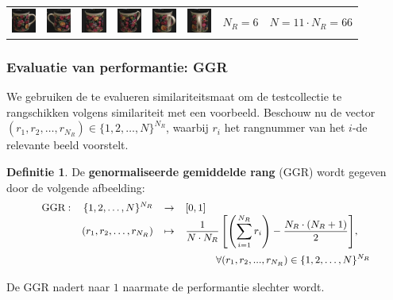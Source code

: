 \documentclass[dutch]{beamer}
\theoremstyle{definition}
\newtheorem{definitie}[theorem]{Definitie}
\theoremstyle{remark}
\theoremstyle{example}
\begin{document}
{\begin{center}
\begin{tabular}{c@{\ }c@{}c@{}c@{}c@{}c c@{\ }c@{}c@{}c@{}c@{}c}
\includegraphics[width=0.8cm]{coil/beeld-60.eps} &
\includegraphics[width=0.8cm]{coil/beeld-61.eps} &
\includegraphics[width=0.8cm]{coil/beeld-62.eps} &
\includegraphics[width=0.8cm]{coil/beeld-63.eps} &
\includegraphics[width=0.8cm]{coil/beeld-64.eps} &
\includegraphics[width=0.8cm]{coil/beeld-65.eps} &
\multicolumn{2}{c}{$N_R = 6$} & 
\multicolumn{4}{c}{$N = 11 \cdot N_R = 66$}

\end{tabular}
\end{center}

}
\frame
{
  \frametitle{Evaluatie van performantie: GGR}

  We gebruiken de te evalueren similariteitsmaat om de testcollectie te rangschikken 
  volgens similariteit met een voorbeeld. Beschouw nu de vector 
  $(r_1,r_2,\ldots,r_{N_R}) \in \{1,2,\ldots,N\}^{N_R}$, 
  waarbij $r_i$ het rangnummer van het $i$-de relevante beeld voorstelt.

  \begin{definitie}
  
  De \textbf{genormaliseerde gemiddelde rang} (GGR) wordt gegeven door de volgende afbeelding:
  $$
  \small\begin{array}{lrcl}
  \text{GGR}: & \{1,2,\ldots,N\}^{N_R} & \to 	& [0,1] \\
		& (r_1,r_2,\ldots,r_{N_R}) & \mapsto &
	{\displaystyle\frac{1}{N \cdot N_R}\left[ \left(\sum_{i=1}^{N_R}r_i\right) - \frac{N_R \cdot (N_R + 1)}{2} \right]},\\[15pt]
	& & & \qquad \quad \forall (r_1, r_2, ..., r_{N_R}) \in \{1,2,\ldots,N\}^{N_R}
  \end{array}
  $$
  \end{definitie}
 
  De GGR nadert naar $1$ naarmate de performantie slechter wordt.
}
\end{document}
